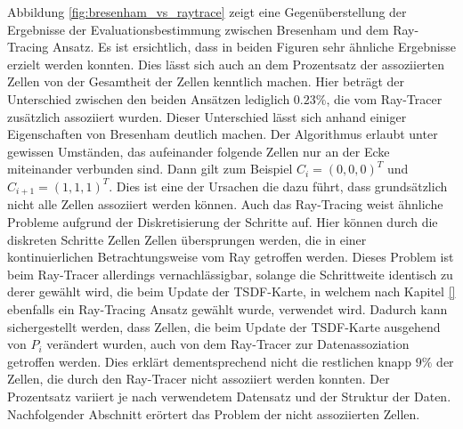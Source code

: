 Abbildung \ref{fig:bresenham_vs_raytrace} zeigt eine Gegenüberstellung der Ergebnisse der Evaluationsbestimmung zwischen Bresenham und dem Ray-Tracing Ansatz. Es ist ersichtlich, dass in beiden Figuren sehr ähnliche Ergebnisse erzielt werden konnten. Dies lässt sich auch an dem Prozentsatz der assoziierten Zellen von der Gesamtheit der Zellen kenntlich machen. Hier beträgt der Unterschied zwischen den beiden Ansätzen lediglich $0.23 \%$, die vom Ray-Tracer zusätzlich assoziiert wurden. Dieser Unterschied lässt sich anhand einiger Eigenschaften von Bresenham deutlich machen. Der Algorithmus erlaubt unter gewissen Umständen, das aufeinander folgende Zellen nur an der Ecke miteinander verbunden sind. Dann gilt zum Beispiel  $C_i = (0,0,0)^T$ und $C_{i+1} = (1,1,1)^T$. Dies ist eine der Ursachen die dazu führt, dass grundsätzlich nicht alle Zellen assoziiert werden können. Auch das Ray-Tracing weist ähnliche Probleme aufgrund der Diskretisierung der Schritte auf. Hier können durch die diskreten Schritte Zellen Zellen übersprungen werden, die in einer kontinuierlichen Betrachtungsweise vom Ray getroffen werden. Dieses Problem ist beim Ray-Tracer allerdings vernachlässigbar, solange die Schrittweite identisch zu derer gewählt wird, die beim Update der TSDF-Karte, in welchem nach Kapitel \ref{} ebenfalls ein Ray-Tracing Ansatz gewählt wurde, verwendet wird. Dadurch kann sichergestellt werden, dass Zellen, die beim Update der TSDF-Karte ausgehend von $P_i$ verändert wurden, auch von dem Ray-Tracer zur Datenassoziation getroffen werden. Dies erklärt dementsprechend nicht die restlichen knapp $9\%$ der Zellen, die durch den Ray-Tracer nicht assoziiert werden konnten. Der Prozentsatz variiert je nach verwendetem Datensatz und der Struktur der Daten. Nachfolgender Abschnitt erörtert das Problem der nicht assoziierten Zellen.


